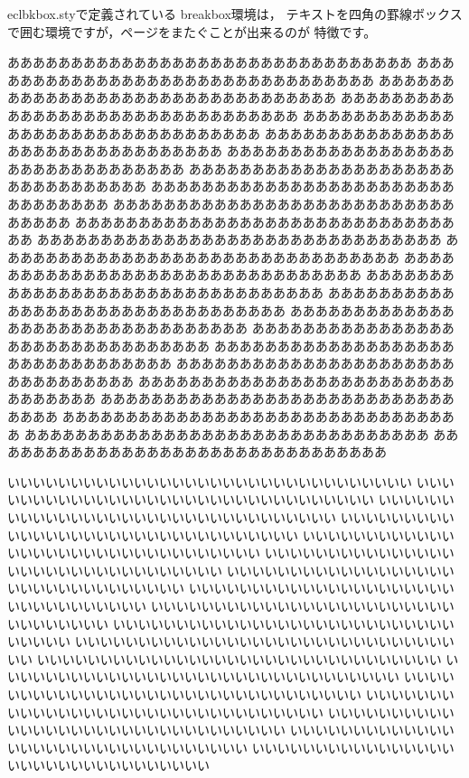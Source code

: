 \begin{breakbox}
\textsf{eclbkbox.sty}で定義されている \textsf{breakbox}環境は，
テキストを四角の罫線ボックスで囲む環境ですが，ページをまたぐことが出来るのが
特徴です。

ああああああああああああああああああああああああああああああああ
ああああああああああああああああああああああああああああああああ
ああああああああああああああああああああああああああああああああ
ああああああああああああああああああああああああああああああああ
ああああああああああああああああああああああああああああああああ
ああああああああああああああああああああああああああああああああ
ああああああああああああああああああああああああああああああああ
ああああああああああああああああああああああああああああああああ
ああああああああああああああああああああああああああああああああ
ああああああああああああああああああああああああああああああああ
ああああああああああああああああああああああああああああああああ
ああああああああああああああああああああああああああああああああ
ああああああああああああああああああああああああああああああああ
ああああああああああああああああああああああああああああああああ
ああああああああああああああああああああああああああああああああ
ああああああああああああああああああああああああああああああああ
ああああああああああああああああああああああああああああああああ
ああああああああああああああああああああああああああああああああ
ああああああああああああああああああああああああああああああああ
ああああああああああああああああああああああああああああああああ
ああああああああああああああああああああああああああああああああ
ああああああああああああああああああああああああああああああああ
ああああああああああああああああああああああああああああああああ
ああああああああああああああああああああああああああああああああ
ああああああああああああああああああああああああああああああああ

いいいいいいいいいいいいいいいいいいいいいいいいいいいいいいいい
いいいいいいいいいいいいいいいいいいいいいいいいいいいいいいいい
いいいいいいいいいいいいいいいいいいいいいいいいいいいいいいいい
いいいいいいいいいいいいいいいいいいいいいいいいいいいいいいいい
いいいいいいいいいいいいいいいいいいいいいいいいいいいいいいいい
いいいいいいいいいいいいいいいいいいいいいいいいいいいいいいいい
いいいいいいいいいいいいいいいいいいいいいいいいいいいいいいいい
いいいいいいいいいいいいいいいいいいいいいいいいいいいいいいいい
いいいいいいいいいいいいいいいいいいいいいいいいいいいいいいいい
いいいいいいいいいいいいいいいいいいいいいいいいいいいいいいいい
いいいいいいいいいいいいいいいいいいいいいいいいいいいいいいいい
いいいいいいいいいいいいいいいいいいいいいいいいいいいいいいいい
いいいいいいいいいいいいいいいいいいいいいいいいいいいいいいいい
いいいいいいいいいいいいいいいいいいいいいいいいいいいいいいいい
いいいいいいいいいいいいいいいいいいいいいいいいいいいいいいいい
いいいいいいいいいいいいいいいいいいいいいいいいいいいいいいいい
いいいいいいいいいいいいいいいいいいいいいいいいいいいいいいいい
いいいいいいいいいいいいいいいいいいいいいいいいいいいいいいいい


\end{breakbox}

